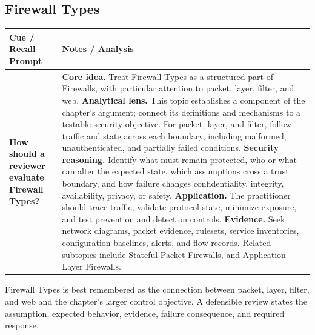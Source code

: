 \documentclass[11pt]{article}
\newcommand{\CornellHeader}{%
\rowcolor{Navy}\color{white}\bfseries Cue / Recall Prompt & \color{white}\bfseries Notes / Analysis\\\hline}
\newcommand{\CornellRow}[2]{%
\cellcolor{CueGray}\RaggedRight\textbf{#1} & \RaggedRight #2\\\hline}
\begin{document}
\subsection*{Firewall Types}
\begin{longtable}{>{\RaggedRight\arraybackslash}p{}|>{\RaggedRight\arraybackslash}p{}}
\CornellHeader
\CornellRow{How should a reviewer evaluate Firewall Types?}{\textbf{Core idea.} Treat Firewall Types as a structured part of Firewalls, with particular attention to packet, layer, filter, and web. \textbf{Analytical lens.} This topic establishes a component of the chapter's argument; connect its definitions and mechanisms to a testable security objective. For packet, layer, and filter, follow traffic and state across each boundary, including malformed, unauthenticated, and partially failed conditions. \textbf{Security reasoning.} Identify what must remain protected, who or what can alter the expected state, which assumptions cross a trust boundary, and how failure changes confidentiality, integrity, availability, privacy, or safety. \textbf{Application.} The practitioner should trace traffic, validate protocol state, minimize exposure, and test prevention and detection controls. \textbf{Evidence.} Seek network diagrams, packet evidence, rulesets, service inventories, configuration baselines, alerts, and flow records. Related subtopics include Stateful Packet Firewalls, and Application Layer Firewalls.}
\end{longtable}
\begin{topicsummary}
Firewall Types is best remembered as the connection between packet, layer, filter, and web and the chapter's larger control objective. A defensible review states the assumption, expected behavior, evidence, failure consequence, and required response.
\end{topicsummary}
\end{document}
